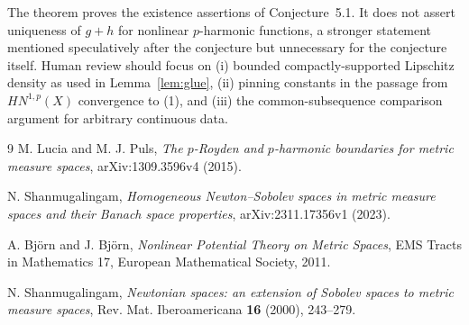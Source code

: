 \documentclass[11pt]{article}
\newcommand{\HN}{HN^{1,p}(X)}
\begin{document}
The theorem proves the existence assertions of Conjecture~5.1.  It does not
assert uniqueness of $g+h$ for nonlinear $p$-harmonic functions, a stronger
statement mentioned speculatively after the conjecture but unnecessary for
the conjecture itself.  Human review should focus on (i) bounded
compactly-supported Lipschitz density as used in Lemma~\ref{lem:glue},
(ii) pinning constants in the passage from $\HN$ convergence to (1), and
(iii) the common-subsequence comparison argument for arbitrary continuous
data.

\begin{thebibliography}{9}
M. Lucia and M. J. Puls,
\emph{The $p$-Royden and $p$-harmonic boundaries for metric measure spaces},
arXiv:1309.3596v4 (2015).

N. Shanmugalingam,
\emph{Homogeneous Newton--Sobolev spaces in metric measure spaces and their
Banach space properties},
arXiv:2311.17356v1 (2023).

A. Bj\"orn and J. Bj\"orn,
\emph{Nonlinear Potential Theory on Metric Spaces},
EMS Tracts in Mathematics 17, European Mathematical Society, 2011.

N. Shanmugalingam,
\emph{Newtonian spaces: an extension of Sobolev spaces to metric measure
spaces},
Rev. Mat. Iberoamericana \textbf{16} (2000), 243--279.
\end{thebibliography}
\end{document}
